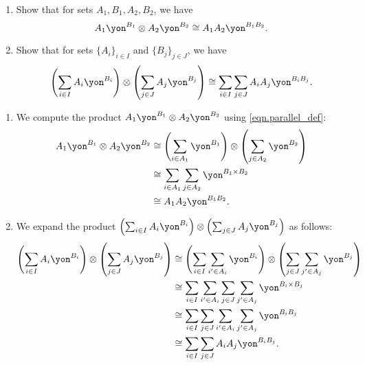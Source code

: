 \documentclass[Book-Poly]{subfiles}
\begin{document}


\begin{exercise} \label{exc.general_poly_parallel_times}
\begin{enumerate}
    \item \label{exc.general_poly_parallel_times.monomial} Show that for sets $A_1, B_1, A_2, B_2$, we have
    \[
        A_1\yon^{B_1} \otimes A_2\yon^{B_2} \iso A_1 A_2\yon^{B_1 B_2}.
    \]
    \item \label{exc.general_poly_parallel_times.polynomial} Show that for sets $\{A_i\}_{i \in I}$ and $\{B_j\}_{j \in J}$, we have
    \[
        \left(\sum_{i \in I} A_i\yon^{B_i}\right) \otimes \left(\sum_{j \in J} A_j\yon^{B_j}\right) \iso \sum_{i \in I} \sum_{j \in J} A_i A_j \yon^{B_i B_j}.
    \]
\end{enumerate}
\begin{solution}
\begin{enumerate}
    \item We compute the product $A_1\yon^{B_1} \otimes A_2\yon^{B_2}$ using \eqref{eqn.parallel_def}:
    \begin{align*}
        A_1\yon^{B_1} \otimes A_2\yon^{B_2} &\iso \left(\sum_{i \in A_1} \yon^{B_1}\right) \otimes \left(\sum_{j \in A_2} \yon^{B_2}\right) \\
        &\iso \sum_{i \in A_1} \sum_{j \in A_2} \yon^{B_1 \times B_2} \\
        &\iso A_1 A_2\yon^{B_1 B_2}.
    \end{align*}

    \item We expand the product $\left(\sum_{i \in I} A_i\yon^{B_i}\right) \otimes \left(\sum_{j \in J} A_j\yon^{B_j}\right)$ as follows:
    \begin{align*}
        \left(\sum_{i \in I} A_i\yon^{B_i}\right) \otimes \left(\sum_{j \in J} A_j\yon^{B_j}\right) &\iso \left(\sum_{i \in I} \sum_{i' \in A_i} \yon^{B_i}\right) \otimes \left(\sum_{j \in J} \sum_{j' \in A_j} \yon^{B_j}\right) \\
        &\iso \sum_{i \in I} \sum_{i' \in A_i} \sum_{j \in J} \sum_{j' \in A_j} \yon^{B_i \times B_j} \\
        &\iso \sum_{i \in I} \sum_{j \in J} \sum_{i' \in A_i} \sum_{j' \in A_j} \yon^{B_i B_j} \\
        &\iso \sum_{i \in I} \sum_{j \in J} A_i A_j \yon^{B_i B_j}.
    \end{align*}
\end{enumerate}
\end{solution}
\end{exercise}
\end{document}
